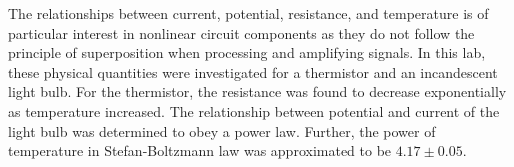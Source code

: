 
\physics

\begin{paperabs}
	
	
	The relationships between current, potential, resistance, and temperature is of particular interest in nonlinear circuit components as they do not follow the principle of superposition when processing and amplifying signals. In this lab, these physical quantities were investigated for a thermistor and an incandescent light bulb. For the thermistor, the resistance was found to decrease exponentially as temperature increased. The relationship between potential and current of the light bulb was determined to obey a power law. Further, the power of temperature in Stefan-Boltzmann law was approximated to be \( 4.17 \pm 0.05 \). 
	
\end{paperabs}

